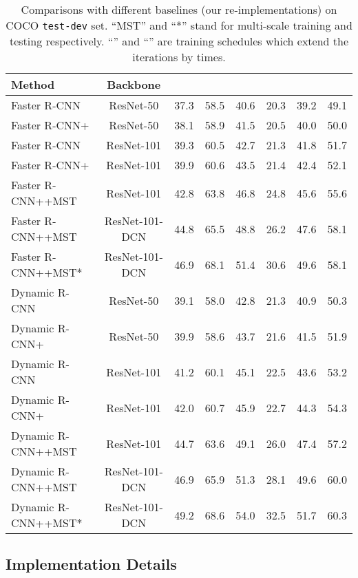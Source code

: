 \documentclass[runningheads]{llncs}
\begin{document}
\begin{table}[!t]
    \caption{Comparisons with different baselines (our re-implementations) on COCO \texttt{test-dev} set. ``MST'' and ``*'' stand for multi-scale training and testing respectively. ``'' and ``'' are training schedules which extend the iterations by  times.}
    \label{tab:main_comparison}
    \begin{center}
\setlength{\tabcolsep}{2pt}
\begin{tabular}{lccccccc}
\toprule
Method & Backbone &  &  &  &  &  & \\
\midrule
Faster R-CNN & ResNet-50 & 37.3 & 58.5 & 40.6 & 20.3 & 39.2 & 49.1\\
Faster R-CNN+ & ResNet-50 & 38.1 & 58.9 & 41.5 & 20.5 & 40.0 & 50.0\\
Faster R-CNN & ResNet-101 & 39.3 & 60.5 & 42.7 & 21.3 & 41.8 & 51.7\\
Faster R-CNN+ & ResNet-101 & 39.9 & 60.6 & 43.5 & 21.4 & 42.4 & 52.1\\
Faster R-CNN++MST & ResNet-101 & 42.8 & 63.8 & 46.8 & 24.8 & 45.6 & 55.6\\
Faster R-CNN++MST & ResNet-101-DCN & 44.8 & 65.5 & 48.8 & 26.2 & 47.6 & 58.1\\
Faster R-CNN++MST* & ResNet-101-DCN & 46.9 & 68.1 & 51.4 & 30.6 & 49.6 & 58.1\\
\midrule
Dynamic R-CNN & ResNet-50 & 39.1 & 58.0 & 42.8 & 21.3 & 40.9 & 50.3\\
Dynamic R-CNN+ & ResNet-50 & 39.9 & 58.6 & 43.7 & 21.6 & 41.5 & 51.9\\
Dynamic R-CNN & ResNet-101 & 41.2 & 60.1 & 45.1 & 22.5 & 43.6 & 53.2\\
Dynamic R-CNN+ & ResNet-101 & 42.0 & 60.7 & 45.9 & 22.7 & 44.3 & 54.3\\
Dynamic R-CNN++MST & ResNet-101 & 44.7 & 63.6 & 49.1 & 26.0 & 47.4 & 57.2\\
Dynamic R-CNN++MST & ResNet-101-DCN & 46.9 & 65.9 & 51.3 & 28.1 & 49.6 & 60.0\\
Dynamic R-CNN++MST* & ResNet-101-DCN & 49.2 & 68.6 & 54.0 & 32.5 & 51.7 & 60.3\\
\bottomrule
\end{tabular}
\end{center}
 \end{table}


\subsection{Implementation Details}
\end{document}
